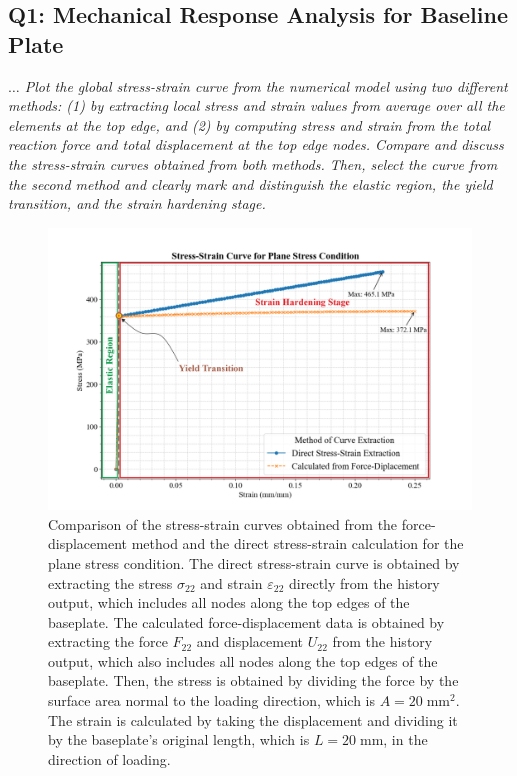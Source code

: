 \documentclass[12pt]{article}
\begin{document}
\subsection*{Q1: Mechanical Response Analysis for Baseline Plate}

\textit{$\dots$ Plot the global stress-strain curve from the numerical model using two different methods: (1)
by extracting local stress and strain values from average over all the elements at the top edge,
and (2) by computing stress and strain from the total reaction force and total displacement at
the top edge nodes. Compare and discuss the stress-strain curves obtained from both methods.
Then, select the curve from the second method and clearly mark and distinguish the elastic
region, the yield transition, and the strain hardening stage.}

\begin{figure}[H]
    \centering
    \includegraphics[width=1\textwidth]{visualize_tensileGraph/res/comparison_direct_calculated_modified.png}
    \caption{Comparison of the stress-strain curves obtained from the force-displacement method and the direct stress-strain calculation 
    for the plane stress condition. The direct stress-strain curve is obtained by extracting the stress $\sigma_{22}$ 
    and strain $\varepsilon_{22}$ directly from the history output, which includes all nodes along the top edges of the baseplate. 
    The calculated force-displacement data is obtained by extracting the force $F_{22}$ and displacement $U_{22}$ from the 
    history output, which also includes all nodes along the top edges of the baseplate.
Then, the stress is obtained by dividing the force by the surface area normal to the loading direction, which is
$A=20 \; \text{mm}^2$. The strain is calculated by taking the displacement and dividing it by the baseplate's original length, which is 
$L=20 \; \text{mm}$, in the direction of loading.} 
    \label{fig:ComparisonDirectCalculated}  
\end{figure}
\end{document}
